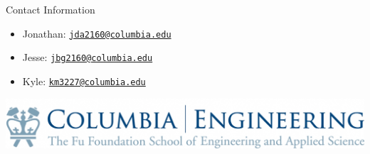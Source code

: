 \documentclass[final]{beamer}
\newlength{\onecolwid}
\begin{document}
\begin{frame}[t]
\begin{columns}[t]
\begin{column}{\onecolwid}
\begin{alertblock}{Contact Information}
\begin{itemize}
\item Jonathan: \href{mailto:jda2160@columbia.edu}{\texttt{jda2160@columbia.edu}}
\item Jesse: \href{mailto:jbg2160@columbia.edu}{\texttt{jbg2160@columbia.edu}}
\item Kyle: \href{mailto:km3227@columbia.edu}{\texttt{km3227@columbia.edu}}
\end{itemize}

\end{alertblock}

\begin{center}
\includegraphics[width=0.8\linewidth]{logo.jpg} %
\end{center}

\end{column} %
\end{columns} %
\end{frame} %
\end{document}

